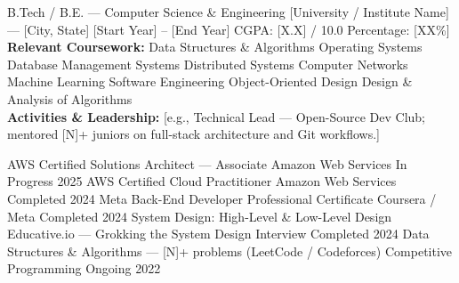 \documentclass{bhaumic}
\begin{document}

\eduentry
  {B.Tech / B.E. — Computer Science \& Engineering}
  {[University / Institute Name] — [City, State]}
  {[Start Year] – [End Year]}
  {CGPA: [X.X] / 10.0  \textbar{}  Percentage: [XX\%]}
\vspace{1pt}
{\small\color{bodytext}%
  \textbf{Relevant Coursework:}
  Data Structures \& Algorithms \textbullet{}
  Operating Systems \textbullet{}
  Database Management Systems \textbullet{}
  Distributed Systems \textbullet{}
  Computer Networks \textbullet{}
  Machine Learning \textbullet{}
  Software Engineering \textbullet{}
  Object-Oriented Design \textbullet{}
  Design \& Analysis of Algorithms
}\\[1pt]
{\small\color{bodytext}%
  \textbf{Activities \& Leadership:}
  [e.g., Technical Lead — Open-Source Dev Club; mentored [N]+ juniors on full-stack architecture and Git workflows.]
}
\vspace{2pt}


\certrow
  {AWS Certified Solutions Architect — Associate}
  {Amazon Web Services}
  {In Progress}
  {2025}
\certrow
  {AWS Certified Cloud Practitioner}
  {Amazon Web Services}
  {Completed}
  {2024}
\certrow
  {Meta Back-End Developer Professional Certificate}
  {Coursera / Meta}
  {Completed}
  {2024}
\certrow
  {System Design: High-Level \& Low-Level Design}
  {Educative.io — Grokking the System Design Interview}
  {Completed}
  {2024}
\certrow
  {Data Structures \& Algorithms — [N]+ problems (LeetCode / Codeforces)}
  {Competitive Programming}
  {Ongoing}
  {2022}
\end{document}
